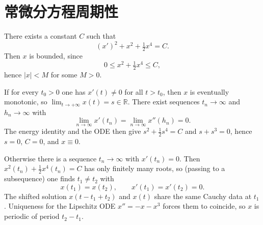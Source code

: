\section{常微分方程周期性}


There exists a constant \(C\) such that
\[
(x')^{2}+x^{2}+\tfrac12 x^{4}=C.
\]
Then \(x\) is bounded, since
\[
0\le x^{2}+\tfrac12 x^{4}\le C,
\]
hence \(\lvert x\rvert<M\) for some \(M>0\).

If for every \(t_{0}>0\) one has \(x'(t)\neq 0\) for all \(t>t_{0}\), then \(x\) is eventually monotonic, so \(\lim_{t\to+\infty}x(t)=s\in\mathbb{R}\). There exist sequences \(t_{n}\to\infty\) and \(h_{n}\to\infty\) with
\[
\lim_{n\to\infty}x'(t_{n})=\lim_{n\to\infty}x''(h_{n})=0.
\]
The energy identity and the ODE then give \(s^{2}+\tfrac12 s^{4}=C\) and \(s+s^{3}=0\), hence \(s=0\), \(C=0\), and \(x\equiv 0\).

Otherwise there is a sequence \(t_{n}\to\infty\) with \(x'(t_{n})=0\). Then \(x^{2}(t_{n})+\tfrac12 x^{4}(t_{n})=C\) has only finitely many roots, so (passing to a subsequence) one finds \(t_{1}\neq t_{2}\) with
\[
x(t_{1})=x(t_{2}),\qquad x'(t_{1})=x'(t_{2})=0.
\]
The shifted solution \(x(t-t_{1}+t_{2})\) and \(x(t)\) share the same Cauchy data at \(t_{1}\). Uniqueness for the Lipschitz ODE \(x''=-x-x^{3}\) forces them to coincide, so \(x\) is periodic of period \(t_{2}-t_{1}\).
